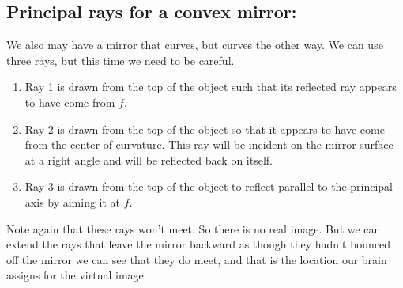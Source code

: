 \documentclass{article}
\begin{document}
\subsection{Principal rays for a convex mirror:}

We also may have a mirror that curves, but curves the other way. We can use
three rays, but this time we need to be careful.

\begin{enumerate}
\item Ray 1 is drawn from the top of the object such that its reflected ray
appears to have come from $f$.

\item Ray 2 is drawn from the top of the object so that it appears to have
come from the center of curvature. This ray will be incident on the mirror
surface at a right angle and will be reflected back on itself.

\item Ray 3 is drawn from the top of the object to reflect parallel to the
principal axis by aiming it at $f$.
\end{enumerate}

Note again that these rays won't
meet. So there is no real image. But we can extend the rays that leave the
mirror backward as though they hadn't bounced off the mirror we can see that
they do meet, and that is the location our brain assigns for the virtual
image.
\end{document}
